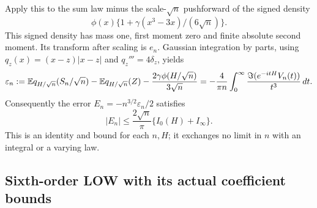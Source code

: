Apply this to the sum law minus the scale-$\sqrt n$ pushforward of
the signed density
\[
 \phi(x)\{1+\gamma(x^3-3x)/(6\sqrt n)\}.
\]
This signed density has mass one, first moment zero and finite absolute
second moment. Its transform after scaling is $e_n$. Gaussian integration
by parts, using $q_z(x)=(x-z)|x-z|$ and $q_z'''=4\delta_z$, yields
\[
 \varepsilon_n:=\mathbb E q_{H/\sqrt n}(S_n/\sqrt n)
 -\mathbb E q_{H/\sqrt n}(Z)-\frac{2\gamma\phi(H/\sqrt n)}{3\sqrt n}
 =-\frac4{\pi n}\int_0^\infty
 \frac{\Im(e^{-itH}V_n(t))}{t^3}\,dt.
\]
Consequently the error $E_n=-n^{3/2}\varepsilon_n/2$ satisfies
\begin{equation}\label{v7fourier:ledger}
 |E_n|\le\frac{2\sqrt n}{\pi}\{I_0(H)+I_\infty\}.
\end{equation}
This is an identity and bound for each $n,H$; it exchanges no limit in
$n$ with an integral or a varying law.

\subsection{Sixth-order LOW with its actual coefficient bounds}

